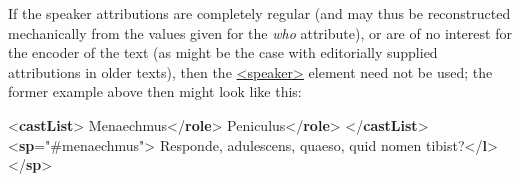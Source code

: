 If the speaker attributions are completely regular (and may thus be reconstructed mechanically from the values given for the {\itshape who} attribute), or are of no interest for the encoder of the text (as might be the case with editorially supplied attributions in older texts), then the \hyperref[TEI.speaker]{<speaker>} element need not be used; the former example above then might look like this: \par\bgroup{}\exampleFont \begin{shaded}\noindent\mbox{}{<\textbf{castList}>}\mbox{}\newline 
{}\mbox{}\newline 
\hspace*{1em}Menaechmus{</\textbf{role}>}\mbox{}\newline 
{}\mbox{}\newline 
{}\mbox{}\newline 
\hspace*{1em}Peniculus{</\textbf{role}>}\mbox{}\newline 
{}\mbox{}\newline 
{</\textbf{castList}>}\mbox{}\newline 
{<\textbf{sp}\hspace*{1em}{who}="{\#menaechmus}">}\mbox{}\newline 
{}Responde, adulescens, quaeso, quid nomen tibist?{</\textbf{l}>}\mbox{}\newline 
{</\textbf{sp}>}\mbox{}\newline 

\end{shaded}

